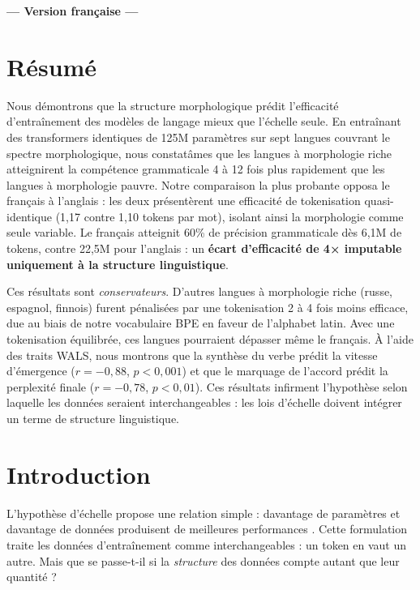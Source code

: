 \documentclass[11pt]{article}
\begin{document}
\newpage


\begin{center}
\Large\textbf{--- Version française ---}
\end{center}

\section*{Résumé}

Nous démontrons que la structure morphologique prédit l'efficacité d'entraînement des modèles de langage mieux que l'échelle seule. En entraînant des transformers identiques de 125M paramètres sur sept langues couvrant le spectre morphologique, nous constatâmes que les langues à morphologie riche atteignirent la compétence grammaticale 4 à 12 fois plus rapidement que les langues à morphologie pauvre. Notre comparaison la plus probante opposa le français à l'anglais : les deux présentèrent une efficacité de tokenisation quasi-identique (1,17 contre 1,10 tokens par mot), isolant ainsi la morphologie comme seule variable. Le français atteignit 60\% de précision grammaticale dès 6,1M de tokens, contre 22,5M pour l'anglais : un \textbf{écart d'efficacité de 4× imputable uniquement à la structure linguistique}.

Ces résultats sont \textit{conservateurs}. D'autres langues à morphologie riche (russe, espagnol, finnois) furent pénalisées par une tokenisation 2 à 4 fois moins efficace, due au biais de notre vocabulaire BPE en faveur de l'alphabet latin. Avec une tokenisation équilibrée, ces langues pourraient dépasser même le français. À l'aide des traits WALS, nous montrons que la synthèse du verbe prédit la vitesse d'émergence ($r=-0,88$, $p<0,001$) et que le marquage de l'accord prédit la perplexité finale ($r=-0,78$, $p<0,01$). Ces résultats infirment l'hypothèse selon laquelle les données seraient interchangeables : les lois d'échelle doivent intégrer un terme de structure linguistique.

\section{Introduction}

L'hypothèse d'échelle propose une relation simple : davantage de paramètres et davantage de données produisent de meilleures performances \citep{kaplan2020scaling, hoffmann2022training}. Cette formulation traite les données d'entraînement comme interchangeables : un token en vaut un autre. Mais que se passe-t-il si la \textit{structure} des données compte autant que leur quantité ?
\end{document}
